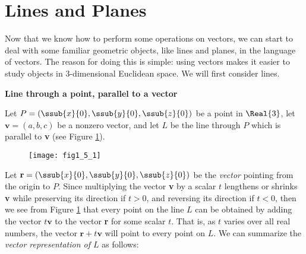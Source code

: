 \section{Lines and Planes}
Now that we know how to perform some operations on vectors, we can start to deal with some familiar geometric objects,
like lines and planes, in the language of vectors. The reason for doing this is simple: using vectors makes it easier
to study objects in 3-dimensional Euclidean space. We will first consider lines.\vspace{4mm}

\par\noindent\textbf{\large{Line through a point, parallel to a vector}}\normalsize\vspace{2mm}

Let $P = (\ssub{x}{0},\ssub{y}{0},\ssub{z}{0})$ be a point in $\Real{3}$, let $\textbf{v} = (a,b,c)$ be a nonzero
vector, and let $L$ be the line through $P$ which is parallel to \textbf{v} (see Figure \ref{fig:linepvec}).

\begin{figure}[h]
 \begin{center}
  \texttt{[image: fig1\_5\_1]}
 \end{center}\vspace{-5mm}
 \caption[]{}
 \label{fig:linepvec}
\end{figure}

Let $\textbf{r} = (\ssub{x}{0},\ssub{y}{0},\ssub{z}{0})$ be the \emph{vector} pointing from the origin to $P$. Since
multiplying the vector \textbf{v} by a scalar $t$ lengthens or shrinks \textbf{v} while preserving its direction
if $t > 0$, and reversing its direction if $t < 0$, then we see from Figure \ref{fig:linepvec} that every point on the
line $L$ can be obtained by adding the vector $t \textbf{v}$ to the vector \textbf{r} for some scalar $t$. That is, as
$t$ varies over all real numbers, the vector $\textbf{r} + t \textbf{v}$ will point to every point on $L$. We can
summarize the \emph{vector representation of $L$} as follows:\vspace{1mm}

